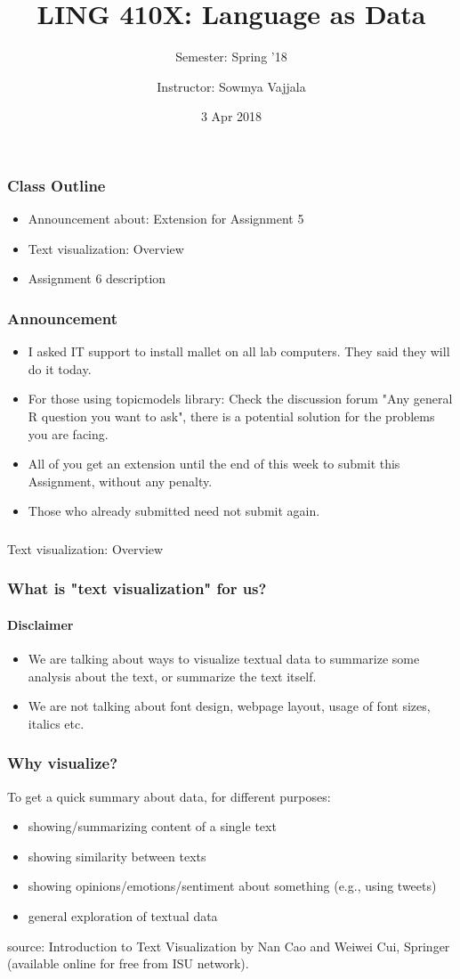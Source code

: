 \documentclass{beamer}
\author[Sowmya Vajjala]{Instructor: Sowmya Vajjala}
\title[LING 410X]{LING 410X: Language as Data}
\subtitle{Semester: Spring '18}
\date{3 Apr 2018}
\institute{Iowa State University, USA}
\begin{document}
\begin{frame}\titlepage
\end{frame}

\begin{frame}
\frametitle{Class Outline}
\begin{itemize}
\item Announcement about: Extension for Assignment 5
\item Text visualization: Overview
\item Assignment 6 description
\end{itemize}
\end{frame}

\begin{frame}
\frametitle{Announcement}
\begin{itemize}
\item I asked IT support to install mallet on all lab computers. They said they will do it today.
\item For those using topicmodels library: Check the discussion forum "Any general R question you want to ask", there is  a potential solution for the problems you are facing.
\item All of you get an extension until the end of this week to submit this Assignment, without any penalty.
\item Those who already submitted need not submit again. 
\end{itemize}
\end{frame}

\begin{frame}
\frametitle{}
\centering
\Large Text visualization: Overview
\end{frame}

\begin{frame}
\frametitle{What is "text visualization" for us?}
\framesubtitle{Disclaimer}
\begin{itemize}
\item We are talking about ways to visualize textual data to summarize some analysis about the text, or summarize the text itself.
\item We are not talking about font design, webpage layout, usage of font sizes, italics etc.
\end{itemize}
\end{frame}


\begin{frame}
\frametitle{Why visualize?}
To get a quick summary about data, for different purposes:
\begin{itemize}
\item showing/summarizing content of a single text
\item showing similarity between texts 
\item showing opinions/emotions/sentiment about something (e.g., using tweets)
\item general exploration of textual data
\end{itemize}
\footnotesize source: Introduction to Text Visualization by Nan Cao and Weiwei Cui, Springer (available online for free from ISU network).
\end{frame}
\end{document}
